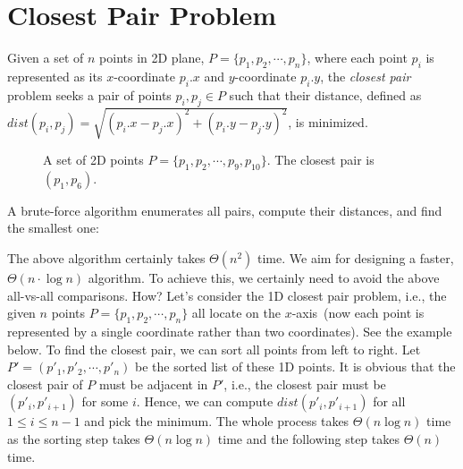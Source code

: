 \setcounter{definition}{0} \setcounter{property}{0} \setcounter{claim}{0} \setcounter{fact}{0} \setcounter{corollary}{0} \setcounter{figure}{0}

\section{Closest Pair Problem}

Given a set of $n$ points in 2D plane, $P = \{p_1, p_2, \cdots, p_n\}$, where each point $p_i$ is
represented as its $x$-coordinate $p_i.x$ and $y$-coordinate $p_i.y$, the \emph{closest pair}
problem seeks a pair of points $p_i, p_j \in P$ such that their distance, 
defined as $dist(p_i, p_j) = \sqrt{(p_i.x - p_j.x)^2 + (p_i.y - p_j.y)^2}$,
is minimized.

\begin{figure}[h!]
\centering{}
\caption{A set of 2D points $P = \{p_1, p_2, \cdots, p_{9}, p_{10}\}$.
The closest pair is $(p_1, p_6)$.}
\label{fig:2d}
\end{figure}


A brute-force algorithm enumerates all pairs, compute their distances,
and find the smallest one: 

\begin{minipage}{0.8\textwidth}
	\xxx
	\xxx
	\xxx
	\xxx
	\xxx
	\xxx
	\xxx
	\xxx
	\xxx
	\xxx
\end{minipage}

The above algorithm certainly takes $\Theta(n^2)$ time.
We aim for designing a faster, $\Theta(n\cdot \log n)$ algorithm.
To achieve this, we certainly need to avoid the above all-vs-all comparisons.
How? Let's consider the 1D closest pair problem, i.e., the given $n$ points $P = \{p_1, p_2, \cdots, p_n\}$
all locate on the $x$-axis~(now each point is represented by a single coordinate rather than two coordinates).
See the example below.
To find the closest pair, we can sort all points from left to right. Let $P' = (p'_1, p'_2, \cdots, p'_n)$ be the
sorted list of these 1D points. It is obvious that the closest pair of $P$ must be adjacent in $P'$, i.e.,
the closest pair must be $(p'_i, p'_{i+1})$ for some $i$. Hence, we can compute $dist(p'_i, p'_{i+1})$ for
all $1\le i \le n - 1$ and pick the minimum. The whole process takes $\Theta(n\log n)$ time as the sorting
step takes $\Theta(n\log n)$ time and the following step takes $\Theta(n)$ time.

